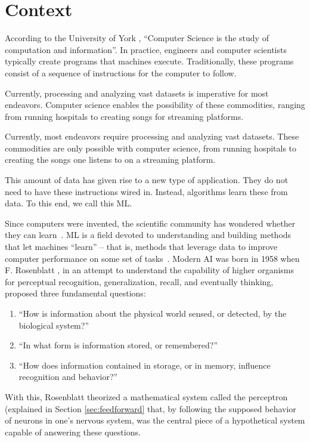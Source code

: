 \section{Context} \label{sec:context}

According to the University of York \cite{university_of_york_what_nodate}, ``Computer Science is the study of computation and information''. In practice, engineers and computer scientists typically create programs that machines execute. Traditionally, these programs consist of a sequence of instructions for the computer to follow.

Currently, processing and analyzing vast datasets is imperative for most endeavors. Computer science enables the possibility of these commodities, ranging from running hospitals to creating songs for streaming platforms.

Currently, most endeavors require processing and analyzing vast datasets. These commodities are only possible with computer science, from running hospitals to creating the songs one listens to on a streaming platform.

This amount of data has given rise to a new type of application. They do not need to have these instructions wired in. Instead, algorithms learn these from data. To this end, we call this \acf{ML}.

Since computers were invented, the scientific community has wondered whether they can learn~\cite{mitchell_machine_1997}. \ac{ML} is a field devoted to understanding and building methods that let machines ``learn'' – that is, methods that leverage data to improve computer performance on some set of tasks~\cite{alpaydin_introduction_2020}. Modern \ac{AI} was born in 1958 when F. Rosenblatt \cite{rosenblatt_perceptron_1958}, in an attempt to understand the capability of higher organisms for perceptual recognition, generalization, recall, and eventually thinking, proposed three fundamental questions:

\begin{enumerate}
	\item ``How is information about the physical world sensed, or detected, by the biological system?''
	\item ``In what form is information stored, or remembered?''
	\item ``How does information contained in storage, or in memory, influence recognition and behavior?''
\end{enumerate}

With this, Rosenblatt theorized a mathematical system called the perceptron (explained in Section \ref{sec:feedforward} that, by following the supposed behavior of neurons in one's nervous system, was the central piece of a hypothetical system capable of answering these questions.

